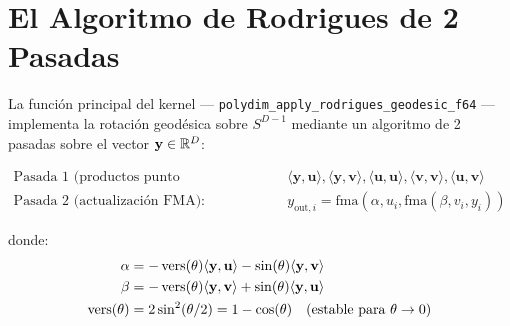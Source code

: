 \section{El Algoritmo de Rodrigues de 2 Pasadas}

La función principal del kernel --- \texttt{polydim\_apply\_rodrigues\_geodesic\_f64}
--- implementa la rotación geodésica sobre $S^{D-1}$ mediante un algoritmo de
2 pasadas sobre el vector $\mathbf{y} \in \mathbb{R}^D$:

\begin{align}
\text{Pasada 1 (productos punto compensados):} &\quad
\langle\mathbf{y}, \mathbf{u}\rangle, \langle\mathbf{y}, \mathbf{v}\rangle,
\langle\mathbf{u}, \mathbf{u}\rangle, \langle\mathbf{v}, \mathbf{v}\rangle,
\langle\mathbf{u}, \mathbf{v}\rangle \\
\text{Pasada 2 (actualización FMA):} &\quad
y_{\text{out},i} = \text{fma}(\alpha, u_i, \text{fma}(\beta, v_i, y_i))
\end{align}

donde:
\begin{align}
\alpha &= -\operatorname{vers}(\theta)\langle\mathbf{y}, \mathbf{u}\rangle - \sin(\theta)\langle\mathbf{y}, \mathbf{v}\rangle \\
\beta  &= -\operatorname{vers}(\theta)\langle\mathbf{y}, \mathbf{v}\rangle + \sin(\theta)\langle\mathbf{y}, \mathbf{u}\rangle \\
\operatorname{vers}(\theta) &= 2\sin^2(\theta/2) = 1 - \cos(\theta) \quad \text{(estable para } \theta \to 0\text{)}
\end{align}


